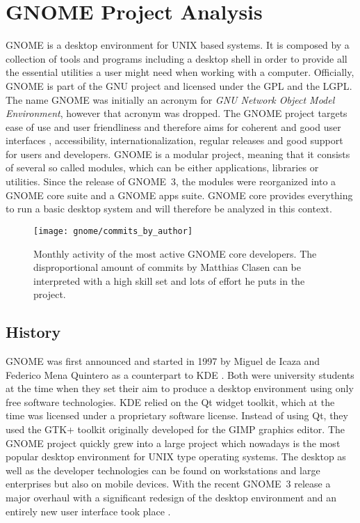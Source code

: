 \section{GNOME Project Analysis} %


GNOME is a desktop environment for UNIX based systems. It is composed by a
collection of tools and programs including a desktop shell in order to provide
all the essential utilities a user might need when working with a computer.
Officially, GNOME is part of the \ac{GNU} project and licensed under the
\ac{GPL} and the \ac{LGPL}. The name GNOME was initially an acronym for
\emph{GNU Network Object Model Environment}, however that acronym was dropped.
The GNOME project targets ease of use and user friendliness and therefore aims
for coherent and good user interfaces \cite{GNOMEHIG}, accessibility,
internationalization, regular releases and good support for users and
developers. GNOME is a modular project, meaning that it consists of several so
called modules, which can be either applications, libraries or utilities. Since
the release of GNOME~3, the modules were reorganized into a GNOME core suite
and a GNOME apps suite. GNOME core provides everything to run a basic desktop
system and will therefore be analyzed in this context.

\begin{figure}[htbp]
  \centering
  \texttt{[image: gnome/commits\_by\_author]}
  \caption{Monthly activity of the most active GNOME core developers. The
  disproportional amount of commits by Matthias Clasen can be interpreted with
  a high skill set and lots of effort he puts in the project.}
\end{figure}

\subsection{History} %

GNOME was first announced and started in 1997 by Miguel de Icaza and Federico
Mena Quintero as a counterpart to KDE
\cite{German2003,GNOMEAbout,GNOMEAnnouncement}. Both were university students
at the time when they set their aim to produce a desktop environment using only
free software technologies. KDE relied on the Qt widget toolkit, which at the
time was licensed under a proprietary software license. Instead of using Qt,
they used the GTK+ toolkit originally developed for the GIMP graphics editor.
The GNOME project quickly grew into a large project which nowadays is the most
popular desktop environment for UNIX type operating systems. The desktop as
well as the developer technologies can be found on workstations and large
enterprises but also on mobile devices. With the recent GNOME~3 release a major
overhaul with a significant redesign of the desktop environment and an entirely
new user interface took place \cite{GNOMEPress}.

